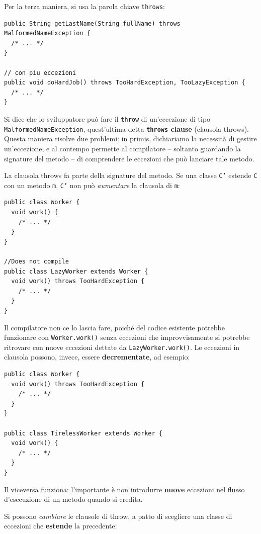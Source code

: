 \documentclass[\fontsizeclass,twocolumn]{\classname}
\theoremstyle{definition}
\theoremstyle{definition}
\begin{document}
Per la terza maniera, si usa la parola chiave \texttt{throws}:

\begin{lstlisting}
public String getLastName(String fullName) throws MalformedNameException {
  /* ... */
}

// con piu eccezioni
public void doHardJob() throws TooHardException, TooLazyException {
  /* ... */
}
\end{lstlisting}

Si dice che lo sviluppatore può fare il \texttt{throw} di un'eccezione di tipo
\texttt{Malformed\-Name\-Exception}, quest'ultima detta \textbf{\texttt{throws}
clause} (clausola throws). Questa maniera risolve due problemi: in primis,
dichiariamo la necessità di gestire un'eccezione, e al contempo permette al
compilatore -- soltanto guardando la signature del metodo -- di comprendere le
eccezioni che può lanciare tale metodo.

La clausola throws fa parte della signature del metodo. Se una classe
\texttt{C'} estende \texttt{C} con un metodo \texttt{m}, \texttt{C'} non può
\emph{aumentare} la clausola di \texttt{m}:

\begin{lstlisting}
public class Worker {
  void work() {
    /* ... */
  }
}

//Does not compile
public class LazyWorker extends Worker {
  void work() throws TooHardException {  
    /* ... */
  }
}
\end{lstlisting}

Il compilatore non ce lo lascia fare, poiché del codice esistente potrebbe
funzionare con \texttt{Worker.work()} senza eccezioni che improvvisamente si
potrebbe ritrovare con nuove eccezioni dettate da \texttt{LazyWorker.work()}.
Le eccezioni in clausola possono, invece, essere \textbf{decrementate}, ad
esempio:

\begin{lstlisting}
public class Worker {
  void work() throws TooHardException {
    /* ... */
  }
}

public class TirelessWorker extends Worker {
  void work() {
    /* ... */
  }
}
\end{lstlisting}

Il viceversa funziona: l'importante è non introdurre \textbf{nuove} eccezioni
nel flusso d'esecuzione di un metodo quando si eredita.

Si possono \emph{cambiare} le clausole di throw, a patto di scegliere una
classe di eccezioni che \textbf{estende} la precedente:
\end{document}
